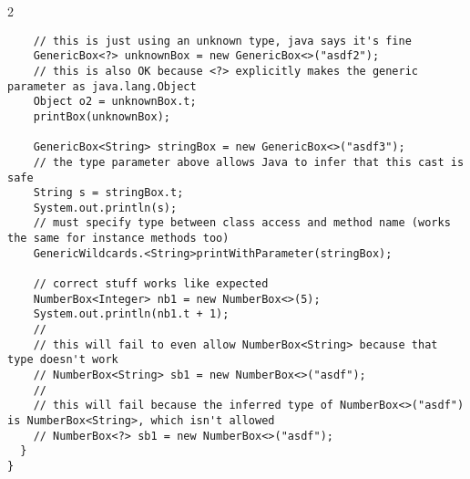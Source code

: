 \documentclass{article}
\def \columncount {2}
\begin{document}
\begin{multicols*}{\columncount}
\begin{outline}[longenum]
\begin{verbatim}
    // this is just using an unknown type, java says it's fine
    GenericBox<?> unknownBox = new GenericBox<>("asdf2");
    // this is also OK because <?> explicitly makes the generic parameter as java.lang.Object
    Object o2 = unknownBox.t;
    printBox(unknownBox);

    GenericBox<String> stringBox = new GenericBox<>("asdf3");
    // the type parameter above allows Java to infer that this cast is safe
    String s = stringBox.t;
    System.out.println(s);
    // must specify type between class access and method name (works the same for instance methods too)
    GenericWildcards.<String>printWithParameter(stringBox);

    // correct stuff works like expected
    NumberBox<Integer> nb1 = new NumberBox<>(5);
    System.out.println(nb1.t + 1);
    //
    // this will fail to even allow NumberBox<String> because that type doesn't work
    // NumberBox<String> sb1 = new NumberBox<>("asdf");
    // 
    // this will fail because the inferred type of NumberBox<>("asdf") is NumberBox<String>, which isn't allowed
    // NumberBox<?> sb1 = new NumberBox<>("asdf");
  }
}
\end{verbatim}



\end{outline}
\end{multicols*}
\end{document}
